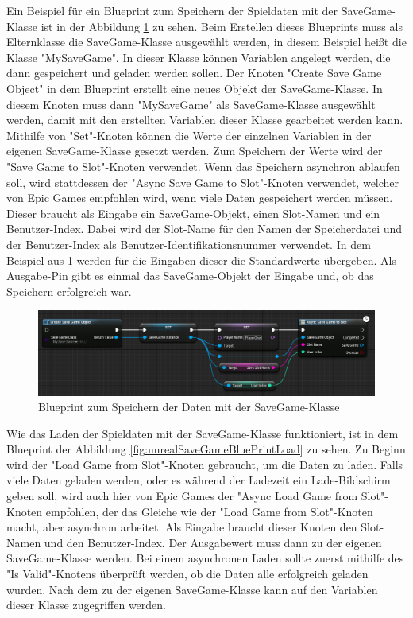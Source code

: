 Ein Beispiel für ein Blueprint zum Speichern der Spieldaten mit der SaveGame-Klasse ist in der Abbildung \ref{fig:unrealSaveGameBluePrintSave} zu sehen. Beim Erstellen dieses Blueprints muss als Elternklasse die SaveGame-Klasse ausgewählt werden, in diesem Beispiel heißt die Klasse "MySaveGame". In dieser Klasse können Variablen angelegt werden, die dann gespeichert und geladen werden sollen. Der Knoten "Create Save Game Object" in dem Blueprint erstellt eine neues Objekt der SaveGame-Klasse. In diesem Knoten muss dann "MySaveGame" als SaveGame-Klasse ausgewählt werden, damit mit den erstellten Variablen dieser Klasse gearbeitet werden kann. Mithilfe von "Set"-Knoten können die Werte der einzelnen Variablen in der eigenen SaveGame-Klasse gesetzt werden. Zum Speichern der Werte wird der "Save Game to Slot"-Knoten verwendet. Wenn das Speichern asynchron ablaufen soll, wird stattdessen der "Async Save Game to Slot"-Knoten verwendet, welcher von Epic Games empfohlen wird, wenn viele Daten gespeichert werden müssen. Dieser braucht als Eingabe ein SaveGame-Objekt, einen Slot-Namen und ein Benutzer-Index. Dabei wird der Slot-Name für den Namen der Speicherdatei und der Benutzer-Index als Benutzer-Identifikationsnummer verwendet. In dem Beispiel aus \ref{fig:unrealSaveGameBluePrintSave} werden für die Eingaben dieser die Standardwerte übergeben. Als Ausgabe-Pin gibt es einmal das SaveGame-Objekt der Eingabe und, ob das Speichern erfolgreich war.\cite{unrealengineSavingLoading}

\begin{figure}[htp]
    \centering
    \includegraphics[width=1\textwidth]{images/SaveGameBP.png}
    \caption{Blueprint zum Speichern der Daten mit der SaveGame-Klasse\cite{unrealengineSavingLoading}}
    \label{fig:unrealSaveGameBluePrintSave}
\end{figure}

Wie das Laden der Spieldaten mit der SaveGame-Klasse funktioniert, ist in dem Blueprint der Abbildung \ref{fig:unrealSaveGameBluePrintLoad} zu sehen. Zu Beginn wird der "Load Game from Slot"-Knoten gebraucht, um die Daten zu laden. Falls viele Daten geladen werden, oder es während der Ladezeit ein Lade-Bildschirm geben soll, wird auch hier von Epic Games der "Async Load Game from Slot"-Knoten empfohlen, der das Gleiche wie der "Load Game from Slot"-Knoten macht, aber asynchron arbeitet. Als Eingabe braucht dieser Knoten den Slot-Namen und den Benutzer-Index. Der Ausgabewert muss dann zu der eigenen SaveGame-Klasse  werden. Bei einem asynchronen Laden sollte zuerst mithilfe des "Is Valid"-Knotens überprüft werden, ob die Daten alle erfolgreich geladen wurden. Nach dem  zu der eigenen SaveGame-Klasse kann auf den Variablen dieser Klasse zugegriffen werden.\cite{unrealengineSavingLoading}

